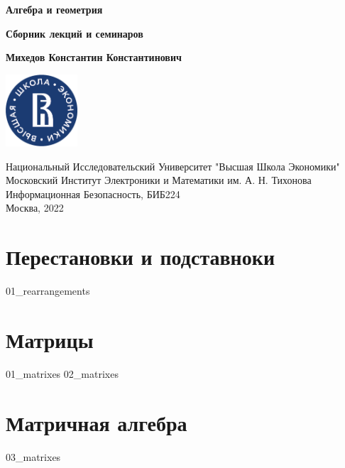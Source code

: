 \documentclass[a4paper,12pt]{article}
\begin{document}
  \begin{titlepage}
    \begin{center}
      \vspace*{1.5cm}

      \Huge
      \textbf{Алгебра и геометрия}

      \vspace{0.5cm} \large
      \textbf{Сборник лекций и семинаров}

      \vspace{1.5cm} \normalsize
      \textbf{Михедов Константин Константинович}

      \vfill

      \includegraphics[width=0.2\textwidth]{hse_logo}

      \vspace{1cm} \footnotesize
      Национальный Исследовательский Университет "Высшая Школа Экономики" \\
      Московский Институт Электроники и Математики им. А. Н. Тихонова \\
      Информационная Безопасность, БИБ224 \\
      Москва, 2022
    \end{center}
  \end{titlepage}

  \section{Перестановки и подставноки}
  {01_rearrangements}

  \section{Матрицы}
  {01_matrixes}
  {02_matrixes}

  \section{Матричная алгебра}
  {03_matrixes}
\end{document}
